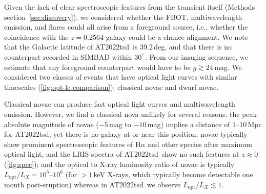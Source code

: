 \documentclass{nature_plusfigure}
\newcommand{\at}{AT2022tsd}
\begin{document}
\begin{methods}

Given the lack of clear spectroscopic features from the transient itself (Methods section~\ref{sec:discovery}), we considered whether the FBOT, multiwavelength emission, and flares could all arise from a foreground source, i.e., whether the coincidence with the $z=0.2564$ galaxy could be a chance alignment. 
We note that the Galactic latitude of \at\ is 39.2\,deg, and that there is no counterpart recorded in SIMBAD within 30$^{\prime\prime}$. From our imaging sequence, we estimate that any foreground counterpart would have to be $g \gtrsim 24\,$mag. We considered two classes of events that have optical light curves with similar timescales (\ref{fig:opt-lc-comparison}): classical novae and dwarf novae.

Classical novae can produce fast optical light curves and multiwavelength emission\cite{Chomiuk2021}. However, we find a classical nova unlikely for several reasons: the peak absolute magnitude of novae ($-5\,$mag to $-10\,$mag\cite{Chomiuk2021}) implies a distance of 1--10\,Mpc for \at, yet there is no galaxy at or near this position; novae typically show prominent spectroscopic features of H$\alpha$ and other species after maximum optical light\cite{Chomiuk2021}, and the LRIS spectra of \at\ show no such features at $z\approx0$ (\ref{fig:spec}); and the optical to X-ray luminosity ratio of novae is typically $L_\mathrm{opt}/L_X=10^{5}$--$10^{6}$ (for $>1\,$keV X-rays, which typically become detectable one month post-eruption\cite{Chomiuk2021}) whereas in \at\ we observe $L_\mathrm{opt}/L_X\lesssim1$. 


\end{methods}
\end{document}
